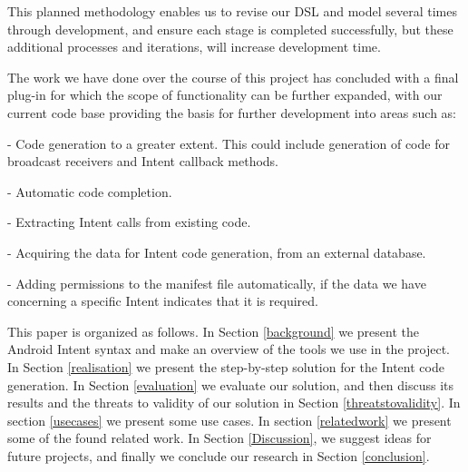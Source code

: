 This planned methodology enables us to revise our DSL and model several times through development, and ensure each stage is completed successfully, but these additional processes and iterations, will increase development time.

The work we have done over the course of this project has concluded with a final plug-in for which the scope of functionality can be further expanded, with our current code base providing the basis for further development into areas such as:

	- Code generation to a greater extent. This could include generation of code for broadcast receivers and Intent callback methods.

	- Automatic code completion.

	- Extracting Intent calls from existing code.

	- Acquiring the data for Intent code generation, from an external database.

	- Adding permissions to the manifest file automatically, if the data we have concerning a specific Intent indicates that it is required.

This paper is organized as follows. In Section \ref{background} we present the Android Intent syntax and make an overview of the tools we use in the project. In Section \ref{realisation} we present the step-by-step solution for the Intent code generation. In Section \ref{evaluation} we evaluate our solution, and then discuss its results and the threats to validity of our solution in Section \ref{threatstovalidity}. In section \ref{usecases} we present some use cases. In section \ref{relatedwork} we present some of the found related work. In Section \ref{Discussion}, we suggest ideas for future projects, and finally we conclude our research in Section \ref{conclusion}.